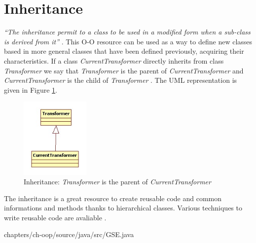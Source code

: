\section{Inheritance}
 
\emph{
	``The inheritance permit to a class to be 
	used in a modified form when a sub-class 
	is derived from it''
} \cite{Capretz:2003}. This O-O resource 
can be used as a way to define new
classes based in more general classes 
that have been 
defined previously, acquiring their characteristics.  
If a class \emph{CurrentTransformer} directly 
inherits from class \emph{Transformer} we say that 
\emph{Transformer} is the parent 
of \emph{CurrentTransformer} and 
\emph{CurrentTransformer} is the 
child of \emph{Transformer} \cite{Snyder:1986}. 
The UML representation is given in 
Figure \ref{fig:inheritance-fig}.

\begin{figure}
  \includegraphics[width=0.3\textwidth]{chapters/ch-oop/figures/inheritance}
  \caption{
  		Inheritance: \emph{Transformer} is the parent 
		of \emph{CurrentTransformer}
		}
  \label{fig:inheritance-fig}
\end{figure}

The inheritance is a great resource to create 
reusable code and common informations and methods 
thanks to hierarchical classes. 
Various techniques to write reusable code are 
avaliable 
\cite{Johnson:1988} 
\cite{Micallef:1988}
\cite{Gossain:1990} 
\cite{Capretz:1992}.  



{chapters/ch-oop/source/java/src/GSE.java} \\


